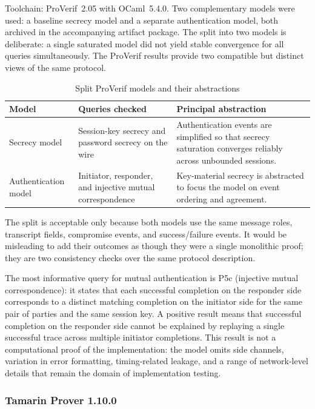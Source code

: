 \documentclass[preprint,12pt]{elsarticle}
\theoremstyle{remark}
\begin{document}
Toolchain: ProVerif~2.05 with OCaml~5.4.0. Two
complementary models were used: a baseline secrecy model and a separate
authentication model, both archived in the accompanying artifact
package. The split into two models is deliberate: a single saturated
model did not yield stable convergence for all queries simultaneously.
The ProVerif results provide two compatible but distinct views of the
same protocol.

\begin{table}[htbp]
\caption{Split ProVerif models and their abstractions}
\label{tab:proverif-split}
\centering\scriptsize
\begin{tabularx}{\textwidth}{@{}L{3.0cm}L{4.6cm}X@{}}
\toprule
Model & Queries checked & Principal abstraction \\
\midrule
Secrecy model & Session-key secrecy and password secrecy on the
wire & Authentication events are simplified so that secrecy saturation
converges reliably across unbounded sessions. \\
Authentication model & Initiator, responder, and injective mutual
correspondence & Key-material secrecy is abstracted to focus the model
on event ordering and agreement. \\
\bottomrule
\end{tabularx}
\end{table}

The split is acceptable only because both models use the same message
roles, transcript fields, compromise events, and success/failure events.
It would be misleading to add their outcomes as though they were a
single monolithic proof; they are two consistency checks over the same
protocol description.

The most informative query for mutual authentication is P5c (injective
mutual correspondence): it states that each successful completion on
the responder side corresponds to a distinct matching completion on the
initiator side for the same pair of parties and the same session key. A
positive result means that successful completion on the responder side
cannot be explained by replaying a single successful trace across
multiple initiator completions. This result is not a computational proof
of the implementation: the model omits side channels, variation in
error formatting, timing-related leakage, and a range of network-level
details that remain the domain of implementation testing.

\subsubsection{Tamarin Prover 1.10.0}
\end{document}
